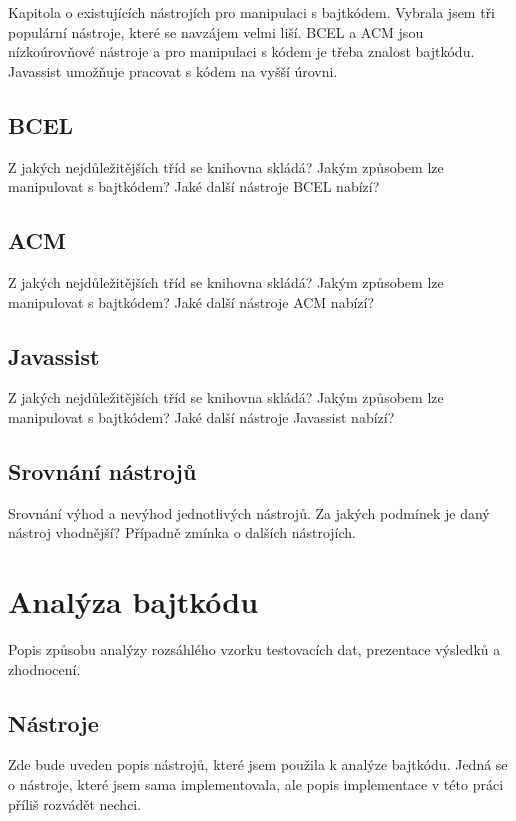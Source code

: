 Kapitola o existujících nástrojích pro manipulaci s bajtkódem.
Vybrala jsem tři populární nástroje, které se navzájem velmi liší.
BCEL a ACM jsou nízkoúrovňové nástroje a pro manipulaci s kódem je třeba znalost bajtkódu.
Javassist umožňuje pracovat s kódem na vyšší úrovni.

\section{BCEL}

Z jakých nejdůležitějších tříd se knihovna skládá?
Jakým způsobem lze manipulovat s bajtkódem?
Jaké další nástroje BCEL nabízí?

\section{ACM}

Z jakých nejdůležitějších tříd se knihovna skládá?
Jakým způsobem lze manipulovat s bajtkódem?
Jaké další nástroje ACM nabízí?


\section{Javassist}

Z jakých nejdůležitějších tříd se knihovna skládá?
Jakým způsobem lze manipulovat s bajtkódem?
Jaké další nástroje Javassist nabízí?

\section{Srovnání nástrojů}

Srovnání výhod a nevýhod jednotlivých nástrojů. Za jakých podmínek je daný nástroj vhodnější?
Případně zmínka o dalších nástrojích.


\chapter{Analýza bajtkódu}

Popis způsobu analýzy rozsáhlého vzorku testovacích dat, prezentace výsledků a zhodnocení.

\section{Nástroje}

Zde bude uveden popis nástrojů, které jsem použila k analýze bajtkódu. 
Jedná se o nástroje, které jsem sama implementovala, ale popis implementace v této práci příliš rozvádět nechci.

